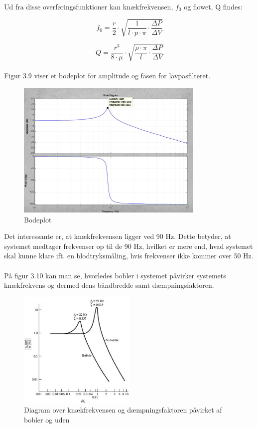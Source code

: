 Ud fra disse overføringsfunktioner kan knækfrekvensen, $f_{0}$ og flowet, Q findes:

\begin{equation}
f_{0} = \frac{r}{2} \cdot \sqrt{\frac{1}{l\cdot p \cdot \pi}\cdot \frac{\Delta P}{\Delta V}}
\end{equation}

\begin{equation}
Q = \frac{r^3}{8 \cdot \mu} \cdot \sqrt{\frac{\rho \cdot \pi}{l}\cdot \frac{\Delta P}{\Delta V}}
\end{equation}
 \\
 
Figur 3.9 viser et bodeplot for amplitude og fasen for lavpasfilteret.

\begin{figure}[H]
	\centering
	\includegraphics[width=0.8\textwidth]{Figurer/Snip20151207_61}
	\caption{Bodeplot}
\end{figure}

Det interessante er, at knækfrekvensen ligger ved 90 Hz. Dette betyder, at systemet medtager frekvenser op til de 90 Hz, hvilket er mere end, hvad systemet skal kunne klare ift. en blodtryksmåling, hvis frekvenser ikke kommer over 50 Hz.
\\\\ 

På figur 3.10 kan man se, hvorledes bobler i systemet påvirker systemets knækfrekvens og dermed dens båndbredde samt dæmpningsfaktoren.   

\begin{figure}[H]
	\centering
	\includegraphics[width=0.5\textwidth]{Figurer/Snip20151207_62}
	\caption{Diagram over knækfrekvensen og dæmpningsfaktoren påvirket af bobler og uden}
\end{figure}

